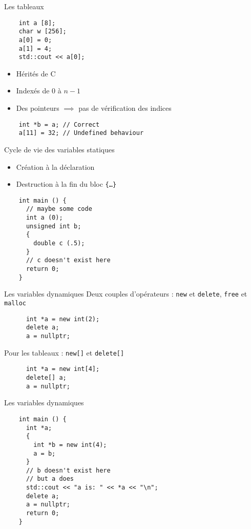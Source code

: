 \begin{frame}[fragile]{Les tableaux}
  \begin{lstlisting}
    int a [8];
    char w [256];
    a[0] = 0;
    a[1] = 4;
    std::cout << a[0];
  \end{lstlisting}

  \begin{itemize}
  \item Hérités de C
  \item Indexés de 0 à $n-1$
  \item Des pointeurs $\implies$ pas de vérification des indices
  \end{itemize}

  \begin{lstlisting}
    int *b = a; // Correct
    a[11] = 32; // Undefined behaviour
  \end{lstlisting}  
\end{frame}

\begin{frame}[fragile]{Cycle de vie des variables statiques}
  \begin{itemize}
  \item Création à la déclaration
  \item Destruction à la fin du bloc \texttt{\{\dots\}}
  \end{itemize}

  \begin{lstlisting}
    int main () {
      // maybe some code
      int a (0);
      unsigned int b;
      {
        double c (.5);
      }
      // c doesn't exist here
      return 0;
    }
  \end{lstlisting}
\end{frame}

\begin{frame}[fragile]{Les variables dynamiques}
  Deux couples d'opérateurs : \texttt{new} et \texttt{delete}, \texttt{free} et \texttt{malloc}
  \begin{lstlisting}
      int *a = new int(2);
      delete a;
      a = nullptr;
  \end{lstlisting}

  Pour les tableaux : \texttt{new[]} et \texttt{delete[]}
  \begin{lstlisting}
      int *a = new int[4];
      delete[] a;
      a = nullptr;
  \end{lstlisting}
\end{frame}

\begin{frame}[fragile]{Les variables dynamiques}
  \begin{lstlisting}
    int main () {
      int *a;
      {
        int *b = new int(4);
        a = b;
      }
      // b doesn't exist here
      // but a does
      std::cout << "a is: " << *a << "\n";
      delete a;
      a = nullptr;
      return 0;
    }
  \end{lstlisting}
\end{frame}

